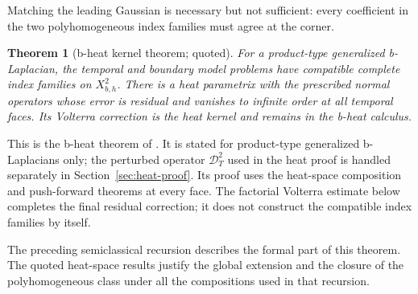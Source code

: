 \documentclass[12pt,oneside,reqno]{article}
\theoremstyle{plain}
\newtheorem{theorem}{Theorem}[section]
\theoremstyle{definition}
\theoremstyle{remark}
\begin{document}
Matching the leading Gaussian is necessary but not sufficient: every
coefficient in the two polyhomogeneous index families must agree at the
corner.

\begin{theorem}[b-heat kernel theorem; quoted]
For a product-type generalized b-Laplacian, the temporal and boundary
model problems have compatible complete index families on
\(X_{b,h}^2\). There is a heat parametrix with the prescribed normal
operators whose error is residual and vanishes to infinite order at all
temporal faces. Its Volterra correction is the heat kernel and remains in
the b-heat calculus.
\end{theorem}

This is the b-heat theorem of \cite[Chapters~6--7]{Melrose}. It is
stated for product-type generalized b-Laplacians only; the perturbed
operator \(\mathcal D_T^2\) used in the heat proof is handled separately
in Section~\ref{sec:heat-proof}. Its proof
uses the heat-space composition and push-forward theorems at every face.
The factorial Volterra estimate below completes the final residual
correction; it does not construct the compatible index families by itself.

The preceding semiclassical recursion describes the formal part of this
theorem.  The quoted heat-space results justify the global extension and
the closure of the polyhomogeneous class under all the compositions used
in that recursion.
\end{document}
